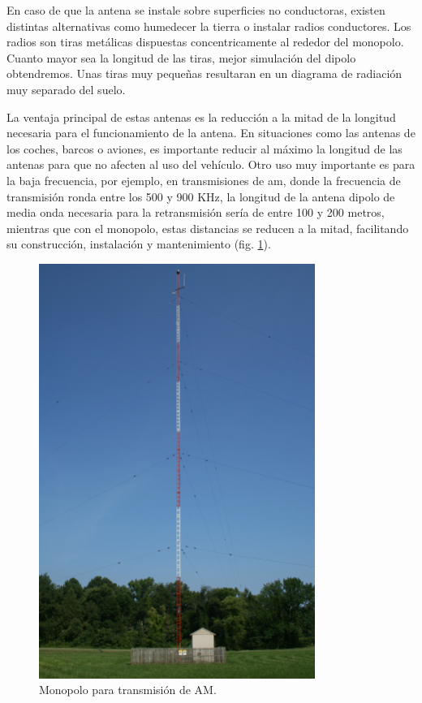 \par En caso de que la antena se instale sobre superficies no conductoras, existen distintas alternativas como humedecer la tierra o instalar radios conductores. Los radios son tiras metálicas dispuestas concentricamente al rededor del monopolo. Cuanto mayor sea la longitud de las tiras, mejor simulación del dipolo obtendremos. Unas tiras muy pequeñas resultaran en un diagrama de radiación muy separado del suelo.
\\
\par La ventaja principal de estas antenas es la reducción a la mitad de la longitud necesaria para el funcionamiento de la antena. En situaciones como las antenas de los coches, barcos o aviones, es importante reducir al máximo la longitud de las antenas para que no afecten al uso del vehículo. Otro uso muy importante es para la baja frecuencia, por ejemplo, en transmisiones de \gls{am}, donde la frecuencia de transmisión ronda entre los 500 y 900 KHz, la longitud de la antena dipolo de media onda necesaria para la retransmisión sería de entre 100 y 200 metros, mientras que con el monopolo, estas distancias se reducen a la mitad, facilitando su construcción, instalación y mantenimiento (fig. \ref{fig:monopoloam}).

\begin{figure}[h]
    \centering
        \includegraphics[width=9cm]{archivos/monopolo/monopolo}
        \caption{Monopolo para transmisión de AM. \citep{Sagdejev2008}}
        \label{fig:monopoloam}
\end{figure}

